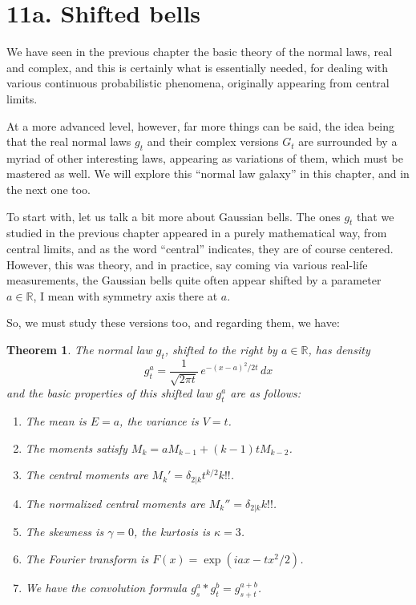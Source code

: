 \documentclass[12pt]{amsbook}
\newtheorem{theorem}{Theorem}[chapter]
\begin{document}
\section*{11a. Shifted bells}

We have seen in the previous chapter the basic theory of the normal laws, real and complex, and this is certainly what is essentially needed, for dealing with various continuous probabilistic phenomena, originally appearing from central limits.

\bigskip

At a more advanced level, however, far more things can be said, the idea being that the real normal laws $g_t$ and their complex versions $G_t$ are surrounded by a myriad of other interesting laws, appearing as variations of them, which must be mastered as well. We will explore this ``normal law galaxy'' in this chapter, and in the next one too.

\bigskip

To start with, let us talk a bit more about Gaussian bells. The ones $g_t$ that we studied in the previous chapter appeared in a purely mathematical way, from central limits, and as the word ``central'' indicates, they are of course centered. However, this was theory, and in practice, say coming via various real-life measurements, the Gaussian bells quite often appear shifted by a parameter $a\in\mathbb R$, I mean with symmetry axis there at $a$. 

\bigskip

So, we must study these versions too, and regarding them, we have:


\begin{theorem}
The normal law $g_t$, shifted to the right by $a\in\mathbb R$, has density
$$g_t^a=\frac{1}{\sqrt{2\pi t}}\,e^{-(x-a)^2/2t}\,dx$$
and the basic properties of this shifted law $g_t^a$ are as follows:
\begin{enumerate}
\item The mean is $E=a$, the variance is $V=t$.

\item The moments satisfy $M_k=aM_{k-1}+(k-1)tM_{k-2}$.

\item The central moments are $M_k'=\delta_{2|k}t^{k/2}k!!$.

\item The normalized central moments are $M_k''=\delta_{2|k}k!!$.

\item The skewness is $\gamma=0$, the kurtosis is $\kappa=3$.

\item The Fourier transform is $F(x)=\exp(iax-tx^2/2)$.

\item We have the convolution formula $g_s^a*g_t^b=g_{s+t}^{a+b}$.
\end{enumerate}
\end{theorem}
\end{document}
